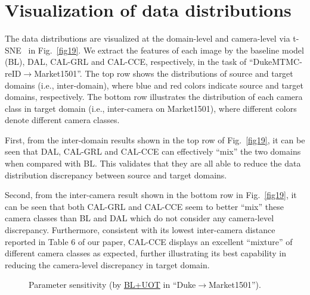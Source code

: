 \documentclass[10pt,twocolumn,letterpaper]{article}
\begin{document}
\renewcommand\thesection{A2}
\section{Visualization of data distributions}
The data distributions are visualized at the domain-level and camera-level via t-SNE~\cite{maaten2008visualizing} in Fig.~\ref{fig19}. We extract the features of each image by the baseline model (BL), DAL, CAL-GRL and CAL-CCE, respectively, in the task of ``DukeMTMC-reID$\rightarrow$Market1501''.  The top row shows the distributions of source and target domains (i.e., inter-domain), where blue and red colors indicate source and target domains, respectively. The bottom row illustrates the distribution of each camera class in target domain (i.e., inter-camera on Market1501), where different colors denote different camera classes. 

First, from the inter-domain results shown in the top row of Fig.~\ref{fig19}, it can be seen that DAL, CAL-GRL and CAL-CCE can effectively ``mix'' the two domains when compared with BL. This validates that they are all able to reduce the data distribution discrepancy between source and target domains. 

Second, from the inter-camera result shown in the bottom row in Fig.~\ref{fig19}, it can be seen that both CAL-GRL and CAL-CCE seem to better ``mix'' these camera classes than BL and DAL which do not consider any camera-level discrepancy. Furthermore, consistent with its lowest inter-camera distance reported in Table 6 of our paper, CAL-CCE displays an excellent ``mixture'' of different camera classes as expected, further illustrating its best capability in reducing the camera-level discrepancy in target domain. \begin{figure}[htb]
\renewcommand\thefigure{A2}
\centering
{}
\caption{\footnotesize Parameter sensitivity (by \underline{BL+UOT} in ``Duke$\rightarrow$Market1501'').}
\label{fig10}
\end{figure}



\renewcommand\thesection{A3}
\end{document}
